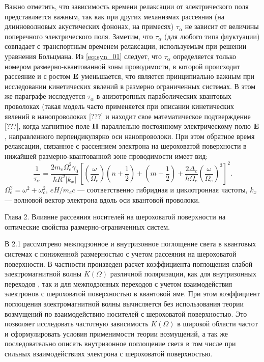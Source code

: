 Важно отметить, что зависимость времени релаксации от электрического поля представляется важным, так как при других механизмах рассеяния (на длинноволновых акустических фононах, на примесях) $\tau_\alpha$ не зависит от величины поперечного электрического поля. Заметим, что $\tau_\alpha$ (для любого типа флуктуации) совпадает с транспортным временем релаксации, используемым при решении уравнения Больцмана.
Из \eqref{eq:syn_01} следует, что $\tau_\alpha$ определяется только номером размерно-квантованной зоны проводимости, в которой происходит рассеяние и с ростом $\boldsymbol{\mathbf{E}}$ уменьшается, что является принципиально важным при исследовании кинетических явлений в размерно ограниченных системах. В этом же параграфе исследуется $\tau_\alpha$ в анизотропных параболических квантовых проволоках (такая модель часто применяется при описании кинетических явлений в нанопроволоках [???]  и находит свое математическое подтверждение [???], когда магнитное поле $\boldsymbol{\mathbf{H}}$ параллельно постоянному электрическому полю $\boldsymbol{\mathbf{E}}$, направленного перпендикулярно оси нанопроволоки. При этом обратное время релаксации, связанное с рассеянием электрона на шероховатой поверхности в нижайшей размерно-квантованной зоне проводимости имеет вид:
\begin{equation} \label{eq:syn_02}
\frac{1}{\tau_\alpha}=\frac{2m_e\Omega^2_e \gamma_0}{\hbar R^2 \left|k_x\right|} \left[\left(\frac{\omega}{\Omega_e}\right) \left(n+\frac{1}{2}\right)+ \left(m+\frac{1}{2}\right)+ \frac{2\Delta_c}{\hbar\Omega_e} \left(\frac{\omega}{\Omega_e}\right)^3\right]^2.
\end{equation}
$\Omega^2_e= \omega^2 + \omega_c^2$, $eH/m_e c$ --- соответственно гибридная и циклотронная частоты, $k_x$ --- волновой вектор электрона вдоль оси квантовой проволоки.

Глава 2. Влияние рассеяния носителей на шероховатой поверхности на оптические свойства размерно-ограниченных систем.

В 2.1 рассмотрено межподзонное и внутризонное поглощение света в квантовых системах с пониженной размерностью с учетом рассеяния на шероховатой поверхности. В частности произведен расчет коэффициента поглощения слабой электромагнитной волны $K\left(\Omega \right)$ различной поляризации, как для внутризонных переходов , так и для межподзонных переходов с учетом взаимодействия электронов с шероховатой поверхностью в квантовой яме. При этом коэффициент поглощения электромагнитной волны вычисляется без использования теории возмущений по взаимодействию носителей с шероховатой поверхностью. Это позволяет исследовать частотную зависимость $K(\Omega)$ в широкой области частот и сформулировать условия применимости теории возмущений, а так же последовательно описать внутризонное поглощение света в том числе при сильных взаимодействиях электрона с шероховатой поверхностью.	


